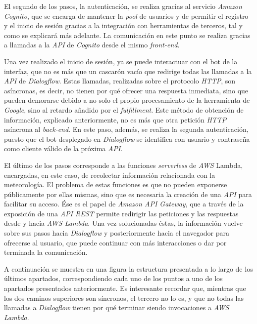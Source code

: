 \documentclass[11pt,spanish,listoffigures]{tfgetsinf}
\begin{document}
El segundo de los pasos, la autenticación, se realiza gracias al servicio \textit{Amazon Cognito}, que se encarga de mantener la \textit{pool} de usuarios y de permitir el registro y el inicio de sesión gracias a la integración con herramientas de terceros, tal y como se explicará más adelante. La comunicación en este punto se realiza gracias a llamadas a la \textit{API} de \textit{Cognito} desde el mismo \textit{front-end}.

Una vez realizado el inicio de sesión, ya se puede interactuar con el bot de la interfaz, que no es más que un cascarón vacío que redirige todas las llamadas a la \textit{API} de \textit{Dialogflow}. Estas llamadas, realizadas sobre el protocolo \textit{HTTP}, son asíncronas, es decir, no tienen por qué ofrecer una respuesta inmediata, sino que pueden demorarse debido a no solo el propio procesamiento de la herramienta de \textit{Google}, sino al retardo añadido por el \textit{fulfillment}. Este método de obtención de información, explicado anteriormente, no es más que otra petición \textit{HTTP} asíncrona al \textit{back-end}.  En este paso, además, se realiza la segunda autenticación, puesto que el bot desplegado en \textit{Dialogflow} se identifica con usuario y contraseña como cliente válido de la próxima \textit{API}.

El último de los pasos corresponde a las funciones \textit{serverless} de \textit{AWS} Lambda, encargadas, en este caso, de recolectar información relacionada con la meteorología. El problema de estas funciones es que no pueden exponerse públicamente por ellas mismas, sino que es necesaria la creación de una \textit{API} para facilitar su acceso. Ése es el papel de \textit{Amazon API Gateway}, que a través de la exposición de una \textit{API REST} permite redirigir las peticiones y las respuestas desde y hacia \textit{AWS Lambda}. Una vez solucionadas éstas, la información vuelve sobre sus pasos hacia \textit{Dialogflow} y posteriormente hacia el navegador para ofrecerse al usuario, que puede continuar con más interacciones o dar por terminada la comunicación.

A continuación se muestra en una figura la estructura presentada a lo largo de los últimos apartados, correspondiendo cada uno de los puntos a uno de los apartados presentados anteriormente. Es interesante recordar que, mientras que los dos caminos superiores son síncronos, el tercero no lo es, y que no todas las llamadas a \textit{Dialogflow} tienen por qué terminar siendo invocaciones a \textit{AWS Lambda}.
\end{document}
